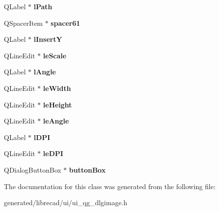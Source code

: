 \begin{DoxyCompactItemize}
\item 
\hypertarget{classUi__QG__DlgImage_ac3ba88e1fc5c8e0da263e7ec8a8c4ae8}{Q\-Label $\ast$ {\bfseries l\-Path}}\label{classUi__QG__DlgImage_ac3ba88e1fc5c8e0da263e7ec8a8c4ae8}

\item 
\hypertarget{classUi__QG__DlgImage_aedecd814f9b42ec9ceaff9b7b31458ed}{Q\-Spacer\-Item $\ast$ {\bfseries spacer61}}\label{classUi__QG__DlgImage_aedecd814f9b42ec9ceaff9b7b31458ed}

\item 
\hypertarget{classUi__QG__DlgImage_a5cdbd6b1f1a47ee3972d6b34d71f6a3b}{Q\-Label $\ast$ {\bfseries l\-Insert\-Y}}\label{classUi__QG__DlgImage_a5cdbd6b1f1a47ee3972d6b34d71f6a3b}

\item 
\hypertarget{classUi__QG__DlgImage_a49ed50b5e01525c63650b3240e88a6d8}{Q\-Line\-Edit $\ast$ {\bfseries le\-Scale}}\label{classUi__QG__DlgImage_a49ed50b5e01525c63650b3240e88a6d8}

\item 
\hypertarget{classUi__QG__DlgImage_a48cb2ff61acd82e4ca7828f9a4486811}{Q\-Label $\ast$ {\bfseries l\-Angle}}\label{classUi__QG__DlgImage_a48cb2ff61acd82e4ca7828f9a4486811}

\item 
\hypertarget{classUi__QG__DlgImage_aa6c28f524f083dc78543f533a136037f}{Q\-Line\-Edit $\ast$ {\bfseries le\-Width}}\label{classUi__QG__DlgImage_aa6c28f524f083dc78543f533a136037f}

\item 
\hypertarget{classUi__QG__DlgImage_aaec0700356ccf35599ad9b7559e98a56}{Q\-Line\-Edit $\ast$ {\bfseries le\-Height}}\label{classUi__QG__DlgImage_aaec0700356ccf35599ad9b7559e98a56}

\item 
\hypertarget{classUi__QG__DlgImage_a487c26c0c742b5b5375c455bbaa76993}{Q\-Line\-Edit $\ast$ {\bfseries le\-Angle}}\label{classUi__QG__DlgImage_a487c26c0c742b5b5375c455bbaa76993}

\item 
\hypertarget{classUi__QG__DlgImage_af93a2b7bfdfdb5c26f38a28baece9663}{Q\-Label $\ast$ {\bfseries l\-D\-P\-I}}\label{classUi__QG__DlgImage_af93a2b7bfdfdb5c26f38a28baece9663}

\item 
\hypertarget{classUi__QG__DlgImage_a8517f4bf6041c6abdd4fa6e48190f1af}{Q\-Line\-Edit $\ast$ {\bfseries le\-D\-P\-I}}\label{classUi__QG__DlgImage_a8517f4bf6041c6abdd4fa6e48190f1af}

\item 
\hypertarget{classUi__QG__DlgImage_a8b8b932e1420bf135d8f10de12bd6286}{Q\-Dialog\-Button\-Box $\ast$ {\bfseries button\-Box}}\label{classUi__QG__DlgImage_a8b8b932e1420bf135d8f10de12bd6286}

\end{DoxyCompactItemize}


The documentation for this class was generated from the following file\-:\begin{DoxyCompactItemize}
\item 
generated/librecad/ui/ui\-\_\-qg\-\_\-dlgimage.\-h\end{DoxyCompactItemize}
